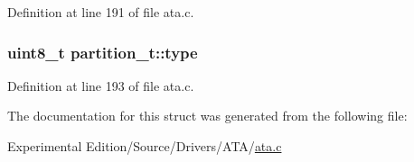 Definition at line 191 of file ata.\+c.

\subsubsection[{\texorpdfstring{type}{type}}]{\setlength{\rightskip}{0pt plus 5cm}uint8\+\_\+t partition\+\_\+t\+::type}\hypertarget{structpartition__t_a587990aa2b5ef1c4c206bb469160288f}{}\label{structpartition__t_a587990aa2b5ef1c4c206bb469160288f}


Definition at line 193 of file ata.\+c.



The documentation for this struct was generated from the following file\+:\begin{DoxyCompactItemize}
\item 
Experimental Edition/\+Source/\+Drivers/\+A\+T\+A/\hyperlink{ata_8c}{ata.\+c}\end{DoxyCompactItemize}
